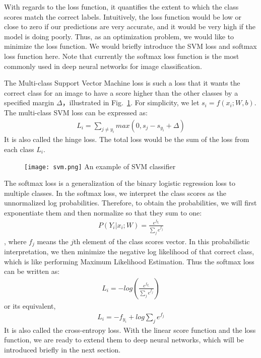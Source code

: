 With regards to the loss function, it quantifies the extent to which the class scores match the correct labels. Intuitively, the loss function would be low or close to zero if our predictions are very accurate, and it would be very high if the model is doing poorly. Thus, as an optimization problem, we would like to minimize the loss function. We would briefly introduce the SVM loss and softmax loss function here. Note that currently the softmax loss function is the most commonly used in deep neural networks for image classification.

The Multi-class Support Vector Machine loss is such a loss that it wants the correct class for an image to have a score higher than the other classes by a specified margin $\Delta$，illustrated in Fig.~\ref{fig:svm}. For simplicity, we let $s_i = f(x_i; W, b)$. The multi-class SVM loss can be expressed as:
\begin{align}L_i = \sum_{j\neq y_i} max(0, s_j - s_{y_i} + \Delta)\end{align}
It is also called the hinge loss. The total loss would be the sum of the loss from each class $L_i$.
\begin{figure}[!htp]
	\centering
	\texttt{[image: svm.png]}
	{An example of SVM classifier}
	\label{fig:svm}
\end{figure}
The softmax loss is a generalization of the binary logistic regression loss to multiple classes. In the softmax loss, we interpret the class scores as the unnormalized log probabilities. Therefore, to obtain the probabilities, we will first exponentiate them and then normalize so that they sum to one: 
\begin{align}
P(Y_i|x_i;W) = \frac{e^{f_{y_i}}}{\sum_j e^{f_j}}
\end{align}, where $f_j$ means the $j$th element of the class scores vector.
In this probabilistic interpretation, we then minimize the negative log likelihood of that correct class, which is like performing Maximum Likelihood Estimation. Thus the softmax loss can be written as:
\begin{align}L_i = -log\left( \frac{e^{f_{y_i}}}{\sum_j e^{f_j}}\right)\end{align}
or its equivalent,
\begin{align} L_i = -f_{y_i} + log \sum_j e^{f_j}\end{align}
It is also called the cross-entropy loss. With the linear score function and the loss function, we are ready to extend them to deep neural networks, which will be introduced briefly in the next section.



